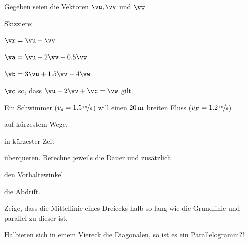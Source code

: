 \documentclass[%
11pt,%
twoside,%
titlepage,%
german,%
headsepline%
]{scrartcl}
\begin{document}
\begin{ueb}
Gegeben seien die Vektoren $\vu,\vv$ und $\vw$.

\begin{center}
\end{center}
Skizziere:
\begin{enumeratea}
\item $\vr=\vu-\vv$
\item $\va=\vu-2\vv+0.5\vw$
\item $\vb=3\vu+1.5\vv-4\vw$
\item $\vc$ so, dass $\vu-2\vv+\vc=\vw$ gilt.
\end{enumeratea}
\end{ueb}

\begin{ueb}
Ein
Schwimmer ($v_s = \unitfrac[1.5]{m}{s}$) will einen $\unit[20]{m}$ breiten Fluss ($v_F = \unitfrac[1.2]{m}{s}$)
\begin{enumeratea}
\item auf kürzestem Wege,
\item in kürzester Zeit
\end{enumeratea}
überqueren. Berechne jeweils die Dauer und zusätzlich
\begin{enumeratea}
\item den Vorhaltewinkel
\item die Abdrift.
\end{enumeratea}
\end{ueb}

\begin{ueb}
Zeige, dass die Mittellinie eines Dreiecks halb so
lang wie die Grundlinie und parallel zu dieser ist.
\end{ueb}

\begin{ueb}
Halbieren
sich in einem Viereck die Diagonalen, so ist es ein Parallelogramm?!
\end{ueb}
\end{document}
